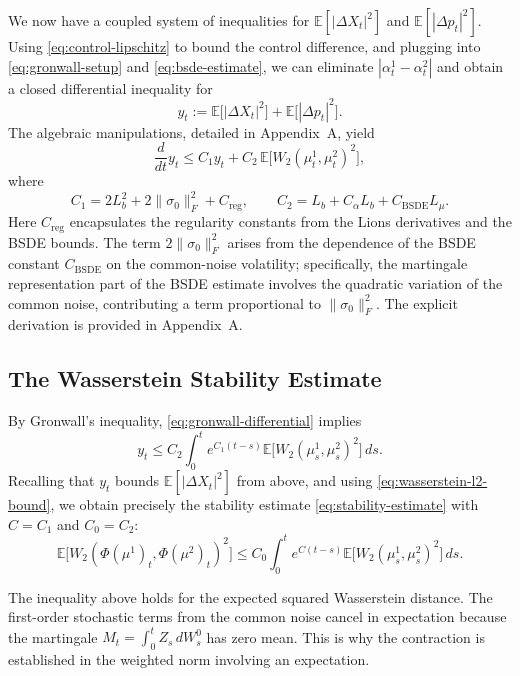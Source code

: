 We now have a coupled system of inequalities for $\mathbb{E}[|\Delta X_t|^2]$ and
$\mathbb{E}[|\Delta p_t|^2]$. Using \eqref{eq:control-lipschitz} to bound the control
difference, and plugging into \eqref{eq:gronwall-setup} and \eqref{eq:bsde-estimate},
we can eliminate $|\alpha_t^1 - \alpha_t^2|$ and obtain a closed differential
inequality for
\[
    y_t := \mathbb{E}\big[|\Delta X_t|^2\big] + \mathbb{E}\big[|\Delta p_t|^2\big].
\]
The algebraic manipulations, detailed in Appendix~A, yield
\begin{equation}
    \frac{d}{dt} y_t \leq C_1 y_t + C_2\, \mathbb{E}\big[W_2(\mu_t^1, \mu_t^2)^2\big],
    \label{eq:gronwall-differential}
\end{equation}
where
\[
    C_1 = 2L_b^2 + 2\|\sigma_0\|_F^2 + C_{\mathrm{reg}}, \qquad
    C_2 = L_b + C_\alpha L_b + C_{\mathrm{BSDE}} L_\mu.
\]
Here $C_{\mathrm{reg}}$ encapsulates the regularity constants from the Lions
derivatives and the BSDE bounds. The term $2\|\sigma_0\|_F^2$ arises from the
dependence of the BSDE constant $C_{\mathrm{BSDE}}$ on the common-noise volatility;
specifically, the martingale representation part of the BSDE estimate involves the
quadratic variation of the common noise, contributing a term proportional to
$\|\sigma_0\|_F^2$. The explicit derivation is provided in Appendix~A.

\subsection{The Wasserstein Stability Estimate}

By Gronwall's inequality, \eqref{eq:gronwall-differential} implies
\[
    y_t \leq C_2 \int_0^t e^{C_1(t-s)} \mathbb{E}\big[W_2(\mu_s^1, \mu_s^2)^2\big]\, ds.
\]
Recalling that $y_t$ bounds $\mathbb{E}[|\Delta X_t|^2]$ from above, and using
\eqref{eq:wasserstein-l2-bound}, we obtain precisely the stability estimate
\eqref{eq:stability-estimate} with $C = C_1$ and $C_0 = C_2$:
\[
    \mathbb{E}\big[W_2(\Phi(\mu^1)_t, \Phi(\mu^2)_t)^2\big] \leq C_0 \int_0^t
    e^{C(t-s)} \mathbb{E}\big[W_2(\mu_s^1, \mu_s^2)^2\big]\, ds.
\]

\begin{remark}
The inequality above holds for the expected squared Wasserstein distance. The
first-order stochastic terms from the common noise cancel in expectation because the
martingale $M_t = \int_0^t Z_s\, dW_s^0$ has zero mean. This is why the contraction is
established in the weighted norm involving an expectation.
\end{remark}


